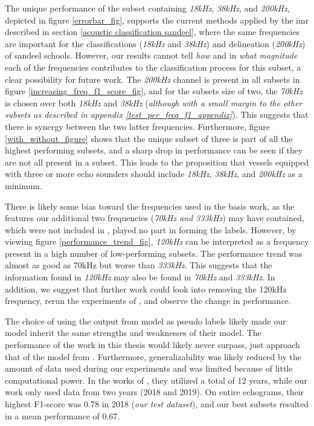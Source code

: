     The unique performance of the subset containing \textit{18kHz}, \textit{38kHz}, and \textit{200kHz}, depicted in figure \ref{errorbar_fig}, supports the current methods applied by the \gls{imr} described in section \ref{acoustic classification sandeel}, where the same frequencies are important for the classifications (\textit{18kHz} and \textit{38kHz}) and delineation (\textit{200kHz}) of sandeel schools. However, our results cannot tell \textit{how} and in \textit{what magnitude} each of the frequencies contributes to the classification process for this subset, a clear possibility for future work. The \textit{200kHz} channel is present in all subsets in figure \ref{increasing_freq_f1_score_fig}, and for the subsets size of two, the \textit{70kHz}  is chosen over both \textit{18kHz} and \textit{38kHz} (\textit{although with a small margin to the other subsets as described in appendix \ref{test_per_freq_f1_appendix}}). This suggests that there is synergy between the two latter frequencies. Furthermore, figure \ref{with_without_figure} shows that the unique subset of three is part of all the highest performing subsets, and a sharp drop in performance can be seen if they are not all present in a subset. This leads to the proposition that vessels equipped with three or more echo sounders should include \textit{18kHz}, \textit{38kHz}, and \textit{200kHz} as a minimum. 

    There is likely some bias toward the frequencies used in the basis work, as the features our additional two frequencies (\textit{70kHz and 333kHz}) may have contained, which were not included in \citet{brautaset2020acoustic}, played no part in forming the labels.  However, by viewing figure \ref{performance_trend_fig}, \textit{120kHz} can be interpreted as a frequency present in a high number of low-performing subsets. The performance trend was almost as good as 70kHz but worse than \textit{333kHz}. This suggests that the information found in \textit{120kHz} may also be found in \textit{70kHz} and \textit{333kHz}. In addition, we suggest that further work could look into removing the 120kHz frequency, rerun the experiments of \citet{brautaset2020acoustic}, and observe the change in performance. 
    
    The choice of using the output from \citeauthor{brautaset2020acoustic} model as pseudo labels likely made our model inherit the same strengths and weaknesses of their model. The performance of the work in this thesis would likely never surpass, just approach that of the model from \citeauthor{brautaset2020acoustic}. Furthermore, generalizability was likely reduced by the amount of data used during our experiments and was limited because of little computational power. In the works of \citeauthor{brautaset2020acoustic}, they utilized a total of 12 years, while our work only used data from two years (2018 and 2019). On entire echograms, their highest F1-score was 0.78 in 2018 (\textit{our test dataset}), and our best subsets resulted in a mean performance of 0.67.
    

